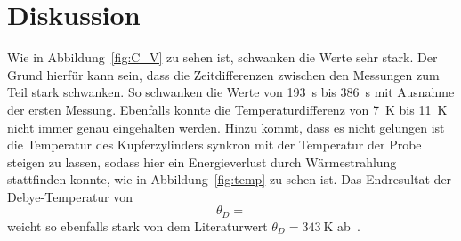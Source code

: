 

\section{Diskussion}

Wie in Abbildung~\ref{fig:C_V} zu sehen ist, schwanken die Werte sehr stark.
Der Grund hierfür kann sein, dass die Zeitdifferenzen zwischen den Messungen
zum Teil stark schwanken. So schwanken die Werte von \SI{193}{\second} bis
\SI{386}{\second} mit Ausnahme der ersten Messung.  Ebenfalls konnte die
Temperaturdifferenz von \SI{7}{\kelvin} bis \SI{11}{\kelvin} nicht immer genau
eingehalten werden.  Hinzu kommt, dass es nicht gelungen ist die Temperatur des
Kupferzylinders synkron mit der Temperatur der Probe steigen zu lassen, sodass hier
ein Energieverlust durch Wärmestrahlung stattfinden konnte, wie in
Abbildung~\ref{fig:temp} zu sehen ist. Das Endresultat der Debye-Temperatur
von%
\begin{equation}%
  \theta_D = 
\end{equation}
weicht so ebenfalls stark von dem Literaturwert
$\theta_D = \SI{343}{\kelvin}$ ab~\cite{DEB}.

